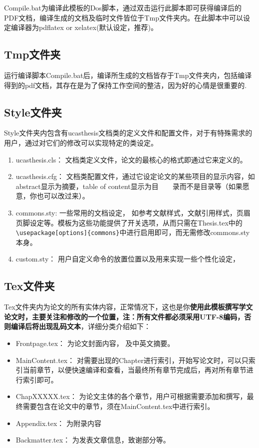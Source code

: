 Compile.bat为编译此模板的Dos脚本，通过双击运行此脚本即可获得编译后的PDF文档，编译生成的文档及临时文件皆位于Tmp文件夹内。在此脚本中可以设定编译器为pdflatex or xelatex(默认设定，推荐)。

\subsection{Tmp文件夹}

运行编译脚本Compile.bat后，编译所生成的文档皆存于Tmp文件夹内，包括编译得到的pdf文档，其存在是为了保持工作空间的整洁，因为好的心情是很重要的.

\subsection{Style文件夹}

Style文件夹内包含有ucasthesis文档类的定义文件和配置文件，对于有特殊需求的用户，通过对它们的修改可以实现特定的类设定。

\begin{enumerate}
  \item ucasthesis.cls： 文档类定义文件，论文的最核心的格式即通过它来定义的。
  \item ucasthesis.cfg： 文档类配置文件，通过它设定论文的某些项目的显示内容，如abstract显示为摘要，table of content显示为目~~~~录而不是目录等（如果愿意，你也可以改过来）。
  \item commons.sty: 一些常用的文档设定， 如参考文献样式，文献引用样式，页眉页脚设定等。模板为这些功能提供了开关选项，从而只需在Thesis.tex中的\verb+\usepackage[options]{commons}+中进行启用即可，而无需修改commons.sty本身。
  \item custom.sty： 用户自定义命令的放置位置以及用来实现一些个性化设定，
\end{enumerate}

\subsection{Tex文件夹}

Tex文件夹内为论文的所有实体内容，正常情况下，这也是你\textbf{使用此模板撰写学文论文时，主要关注和修改的一个位置，注：所有文件都必须采用UTF-8编码，否则编译后将出现乱码文本}，详细分类介绍如下：

\begin{itemize}
  \item Frontpage.tex： 为论文封面内容， 及中英文摘要。
  \item Main\textunderscore Content.tex： 对需要出现的Chapter进行索引，开始写论文时，可以只索引当前章节，以便快速编译和查看，当最终所有章节完成后，再对所有章节进行索引即可。
  \item Chap\textunderscore XXXXX.tex： 为论文主体的各个章节，用户可根据需要添加和撰写，最终需要包含在论文中的章节，须在Main\textunderscore Content.tex中进行索引。
  \item Appendix.tex： 为附录内容
  \item Backmatter.tex： 为发表文章信息，致谢部分等。
\end{itemize}

